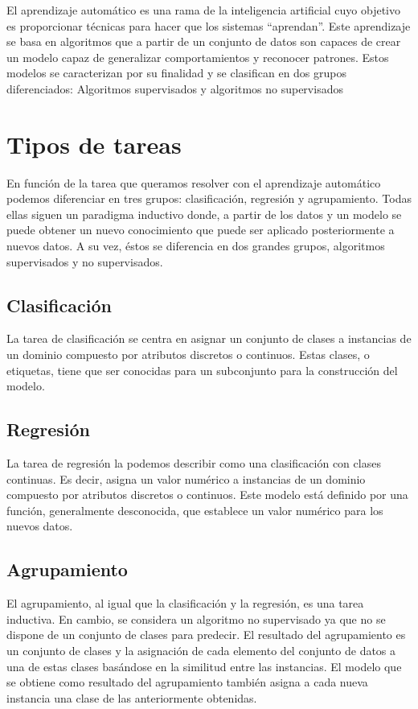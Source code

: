 El aprendizaje automático es una rama de la inteligencia artificial cuyo objetivo es proporcionar técnicas para hacer que los sistemas “aprendan”. Este aprendizaje se basa en algoritmos que a partir de un conjunto de datos son capaces de crear un modelo capaz de generalizar comportamientos y reconocer patrones. Estos modelos se caracterizan por su finalidad y se clasifican en dos grupos diferenciados: Algoritmos supervisados y algoritmos no supervisados

\section{Tipos de tareas}
En función de la tarea que queramos resolver con el aprendizaje automático podemos diferenciar en tres grupos: clasificación, regresión y agrupamiento. Todas ellas siguen un paradigma inductivo donde, a partir de los datos y un modelo se puede obtener un nuevo conocimiento que puede ser aplicado posteriormente a nuevos datos. A su vez, éstos se diferencia en dos grandes grupos, algoritmos supervisados y no supervisados. 

\subsection{Clasificación}
La tarea de clasificación se centra en asignar un conjunto de clases a instancias de un dominio compuesto por atributos discretos o continuos. Estas clases, o etiquetas, tiene que ser conocidas para un subconjunto para la construcción del modelo.

\subsection{Regresión}
La tarea de regresión la podemos describir como una clasificación con clases continuas. Es decir, asigna un valor numérico a instancias de un dominio compuesto por atributos discretos o continuos. Este modelo está definido por una función, generalmente desconocida, que establece un valor numérico para los nuevos datos.

\subsection{Agrupamiento}
El agrupamiento, al igual que la clasificación y la regresión, es una tarea inductiva. En cambio, se considera un algoritmo no supervisado ya que no se dispone de un conjunto de clases para predecir. El resultado del agrupamiento es un conjunto de clases y la asignación de cada elemento del conjunto de datos a una de estas clases basándose en la similitud entre las instancias. El modelo que se obtiene como resultado del agrupamiento también asigna a cada nueva instancia una clase de las anteriormente obtenidas.

